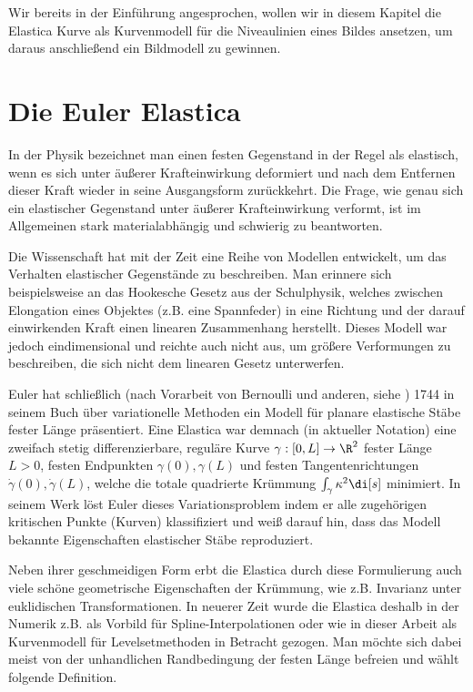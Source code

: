 \documentclass{mythesis}
\begin{document}
Wir bereits in der Einführung angesprochen, wollen wir in diesem Kapitel die Elastica Kurve als Kurvenmodell für die Niveaulinien eines Bildes ansetzen, um daraus anschließend ein Bildmodell zu gewinnen.

\section{Die Euler Elastica}

In der Physik bezeichnet man einen festen Gegenstand in der Regel als elastisch, wenn es sich unter äußerer Krafteinwirkung deformiert und nach dem Entfernen dieser Kraft wieder in seine Ausgangsform zurückkehrt.
Die Frage, wie genau sich ein elastischer Gegenstand unter äußerer Krafteinwirkung verformt, ist im Allgemeinen stark materialabhängig und schwierig zu beantworten.

Die Wissenschaft hat mit der Zeit eine Reihe von Modellen entwickelt, um das Verhalten elastischer Gegenstände zu beschreiben.
Man erinnere sich beispielsweise an das Hookesche Gesetz aus der Schulphysik, welches zwischen Elongation eines Objektes (z.B. eine Spannfeder) in eine Richtung und der darauf einwirkenden Kraft einen linearen Zusammenhang herstellt.
Dieses Modell war jedoch eindimensional und reichte auch nicht aus, um größere Verformungen zu beschreiben, die sich nicht dem linearen Gesetz unterwerfen.

Euler hat schließlich (nach Vorarbeit von Bernoulli und anderen, siehe \cite{levien2008elastica}) 1744 in seinem Buch über variationelle Methoden \cite{euler1774methodus} ein Modell für planare elastische Stäbe fester Länge präsentiert.
Eine Elastica war demnach (in aktueller Notation) eine zweifach stetig differenzierbare, reguläre Kurve $\gamma: [0,L] \to \R^2$ fester Länge $L > 0$, festen Endpunkten $\gamma(0), \gamma(L)$ und festen Tangentenrichtungen $\dot \gamma(0), \dot \gamma(L)$, welche die totale quadrierte Krümmung
\begin{math}
    \int_\gamma \kappa^2 \di[s]
\end{math}
minimiert.
In seinem Werk löst Euler dieses Variationsproblem indem er alle zugehörigen kritischen Punkte (Kurven) klassifiziert und weiß darauf hin, dass das Modell bekannte Eigenschaften elastischer Stäbe reproduziert.

Neben ihrer geschmeidigen Form erbt die Elastica durch diese Formulierung auch viele schöne geometrische Eigenschaften der Krümmung, wie z.B. Invarianz unter euklidischen Transformationen.
In neuerer Zeit wurde die Elastica deshalb in der Numerik z.B. als Vorbild für Spline-Interpolationen oder wie in dieser Arbeit als Kurvenmodell für Levelsetmethoden in Betracht gezogen.
Man möchte sich dabei meist von der unhandlichen Randbedingung der festen Länge befreien und wählt folgende Definition.
\end{document}
